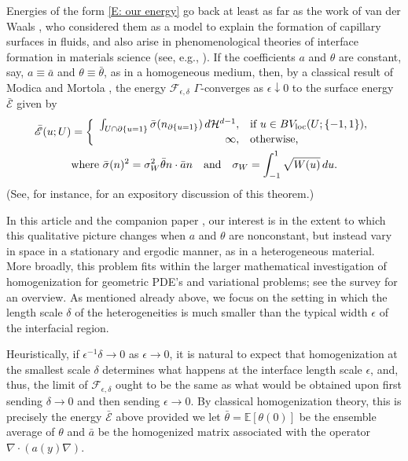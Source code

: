 \documentclass[12pt]{amsart}
\begin{document}
Energies of the form \eqref{E: our energy} go back at least as far as the work of van der Waals \cite{van-der-waals,rowlinson_translation}, who considered them as a model to explain the formation of capillary surfaces in fluids, and also arise in phenomenological theories of interface formation in materials science (see, e.g., \cite[Chapter 8]{glicksman2010principles}).  If the coefficients $a$ and $\theta$ are constant, say, $a \equiv \bar{a}$ and $\theta \equiv \bar{\theta}$, as in a homogeneous medium, then, by a classical result of Modica and Mortola \cite{modica_mortola, modica}, the energy $\mathscr{F}_{\epsilon,\delta}$ $\Gamma$-converges as $\epsilon \downarrow 0$ to the surface energy $\bar{ \mathscr{E} }$ given by
	\begin{align}
		\bar{ \mathscr{ E } }(u ; U ) &= \left\{ \begin{array}{r l}
			\int_{ U \cap \partial \{ u = 1 \} } \bar{\sigma} ( n_{\partial \{ u = 1 \} } ) \, d \mathcal{H}^{d-1}, & \text{if} \, \, u \in BV_{\text{loc}}(U; \{-1,1\}),  \\
			 \infty, & \text{otherwise,}
		\end{array} \right. \label{E: homogenized energy} \\ 
		&\text{where} \, \, \bar{\sigma}(n)^{2} = \sigma_{W}^{2} \bar{\theta}  n \cdot \bar{a} n  \quad \text{and} \quad \sigma_{W} = \int_{-1}^{1} \sqrt{ W(u) } \, du. \nonumber
	\end{align}
(See, for instance, \cite{AlbertiLectureNotes} for an expository discussion of this theorem.)

In this article and the companion paper \cite{part1}, our interest is in the extent to which this qualitative picture changes when $a$ and $\theta$ are nonconstant, but instead vary in space in a stationary and ergodic manner, as in a heterogeneous material. More broadly, this problem fits within the larger mathematical investigation of homogenization for geometric PDE's and variational problems; see the survey \cite{caffarelli} for an overview.  As mentioned already above, we focus on the setting in which the length scale $\delta$ of the heterogeneities is much smaller than the typical width $\epsilon$ of the interfacial region.

Heuristically, if $\epsilon^{-1} \delta \to 0$ as $\epsilon \to 0$, it is natural to expect that homogenization at the smallest scale $\delta$ determines what happens at the interface length scale $\epsilon$, and, thus, the limit of $\mathscr{F}_{\epsilon,\delta}$ ought to be the same as what would be obtained upon first sending $\delta \to 0$ and then sending $\epsilon \to 0$.  By classical homogenization theory, this is precisely the energy $\bar{\mathscr{E}}$ above provided we let $\bar{\theta} = \mathbb{E} [ \theta(0) ]$ be the ensemble average of $\theta$ and $ \bar{a} $ be the homogenized matrix associated with the operator $\nabla \cdot ( a(y) \nabla )$.
\end{document}
